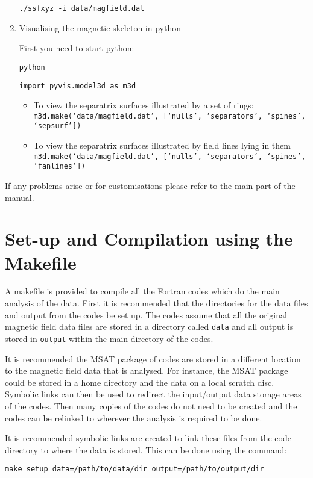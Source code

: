 \documentclass[12pt]{article}
\begin{document}
\begin{enumerate}
      \texttt{./ssfxyz -i data/magfield.dat}

      \item Visualising the magnetic skeleton in python

      First you need to start python:

      \texttt{python}

      \texttt{import pyvis.model3d as m3d}

      \begin{itemize}
        \item To view the separatrix surfaces illustrated by a set of rings:
        \texttt{m3d.make(`data/magfield.dat', [`nulls', `separators', `spines', `sepsurf'])}
        \item To view the separatrix surfaces illustrated by field lines lying in them
        \texttt{m3d.make(`data/magfield.dat', [`nulls', `separators', `spines', `fanlines'])}
      \end{itemize}
    \end{enumerate}
    If any problems arise or for customisations please refer to the main part of the manual.

  \section{Set-up and Compilation using the Makefile}

    A makefile is provided to compile all the Fortran codes which do the main analysis of the data. First it is recommended that the directories for the data files and output from the codes be set up. The codes assume that all the original magnetic field data files are stored in a directory called \texttt{data} and all output is stored in \texttt{output} within the main directory of the codes.

    It is recommended the MSAT package of codes are stored in a different location to the magnetic field data that is analysed. For instance, the MSAT package could be stored in a home directory and the data on a local scratch disc. Symbolic links can then be used to redirect the input/output data storage areas of the codes. Then many copies of the codes do not need to be created and the codes can be relinked to wherever the analysis is required to be done.

    It is recommended symbolic links are created to link these files from the code directory to where the data is stored. This can be done using the command:

    \texttt{make setup data=/path/to/data/dir output=/path/to/output/dir}
\end{document}
